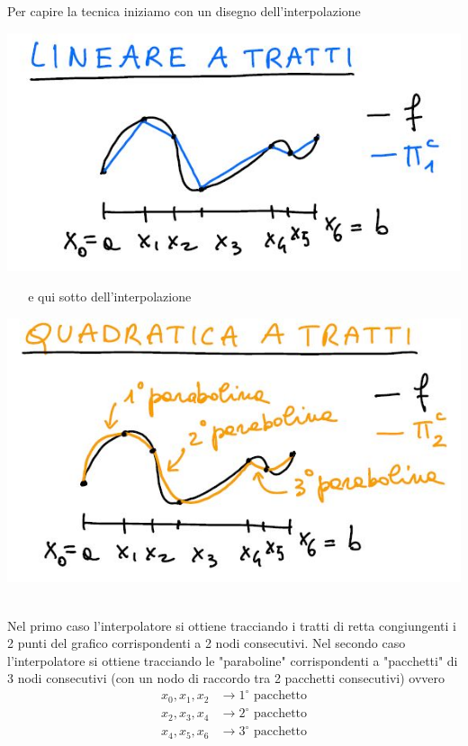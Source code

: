\documentclass[12pt,a4paper]{article}
\begin{document}
\begin{minipage}{0.5\textwidth}
Per capire la tecnica iniziamo con un disegno dell'interpolazione
\begin{center}
    \includegraphics[scale=0.5]{calcolo2.JPG}
\end{center}
\end{minipage}
\begin{minipage}{0.5\textwidth}
$\ \ \ \ \ \ $ e qui sotto dell'interpolazione\\
\begin{center}
    \includegraphics[scale=0.5]{calcolo3.JPG}
\end{center}
\end{minipage}\\
Nel primo caso l'interpolatore si ottiene tracciando i tratti di retta congiungenti i 2 punti del grafico corrispondenti a 2 nodi consecutivi. Nel secondo caso l'interpolatore si ottiene tracciando le "paraboline" corrispondenti a "pacchetti" di 3 nodi consecutivi (con un nodo di raccordo tra 2 pacchetti consecutivi) ovvero
\[\begin{split}
    x_0,x_1,x_2 & \rightarrow 1^\circ \text{ pacchetto}\\
    x_2,x_3,x_4 & \rightarrow 2^\circ \text{ pacchetto}\\
    x_4,x_5,x_6 & \rightarrow 3^\circ \text{ pacchetto}
\end{split}\]
\end{document}
